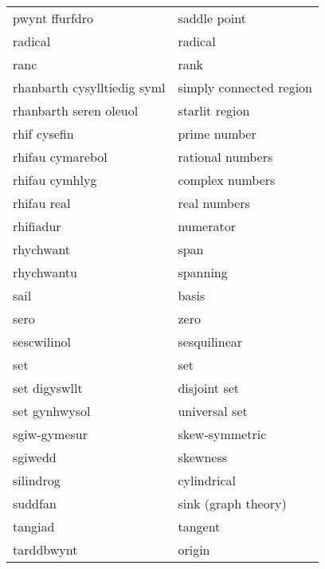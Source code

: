 \begin{supertabular}{p{0.22\textwidth}p{0.22\textwidth}}
                  pwynt ffurfdro &                      saddle point \\
                         radical &                           radical \\
                            ranc &                              rank \\
     rhanbarth cysylltiedig syml &           simply connected region \\
          rhanbarth seren oleuol &                    starlit region \\
                    rhif cysefin &                      prime number \\
                rhifau cymarebol &                  rational numbers \\
                  rhifau cymhlyg &                   complex numbers \\
                     rhifau real &                      real numbers \\
                       rhifiadur &                         numerator \\
                       rhychwant &                              span \\
                      rhychwantu &                          spanning \\
                            sail &                             basis \\
                            sero &                              zero \\
                     sescwilinol &                      sesquilinear \\
                             set &                               set \\
                   set digyswllt &                      disjoint set \\
                   set gynhwysol &                     universal set \\
                    sgiw-gymesur &                    skew-symmetric \\
                         sgiwedd &                          skewness \\
                       silindrog &                       cylindrical \\
                         suddfan &               sink (graph theory) \\
                         tangiad &                           tangent \\
                      tarddbwynt &                            origin \\

\end{supertabular}

